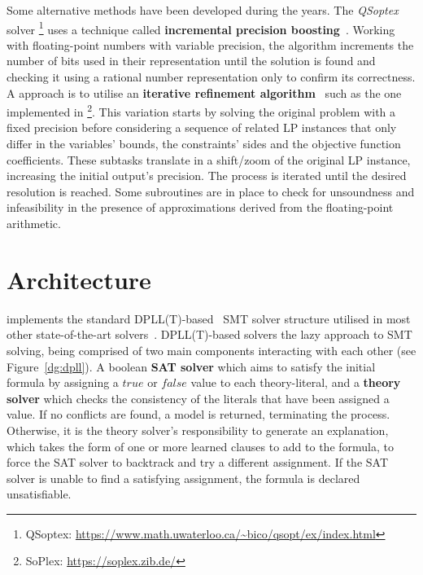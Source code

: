 \documentclass[runningheads]{llncs}
\begin{document}
Some alternative methods have been developed during the years.
The \textit{QSoptex} solver \footnote{QSoptex: \url{https://www.math.uwaterloo.ca/~bico/qsopt/ex/index.html}} uses a technique called \textbf{incremental precision boosting}~\cite{ref:precision-boosting}.
Working with floating-point numbers with variable precision, the algorithm increments the number of bits used in their representation until the solution is found and checking it using a rational number representation only to confirm its correctness.
A approach is to utilise an \textbf{iterative refinement algorithm}~\cite{ref:iterative-refinement} such as the one implemented in \soplex \footnote{SoPlex: \url{https://soplex.zib.de/}}.
This variation starts by solving the original problem with a fixed precision before considering a sequence of related LP instances that only differ in the variables' bounds, the constraints' sides and the objective function coefficients.
These subtasks translate in a shift/zoom of the original LP instance, increasing the initial output's precision.
The process is iterated until the desired resolution is reached.
Some subroutines are in place to check for unsoundness and infeasibility in the presence of approximations derived from the floating-point arithmetic.

\section{Architecture}

\dlinear implements the standard DPLL(T)-based~\cite{ref:dpll-t} SMT solver structure utilised in most other state-of-the-art solvers~\cite{ref:z3-dpll-t}.
DPLL(T)-based solvers the lazy approach to SMT solving, being comprised of two main components interacting with each other (see Figure~\ref{dg:dpll}).
A boolean \textbf{SAT solver} which aims to satisfy the initial formula by assigning a $true$ or $false$ value to each theory-literal, and a \textbf{theory solver} which checks the consistency of the literals that have been assigned a value.
If no conflicts are found, a model is returned, terminating the process.
Otherwise, it is the theory solver's responsibility to generate an explanation, which takes the form of one or more learned clauses to add to the formula, to force the SAT solver to backtrack and try a different assignment.
If the SAT solver is unable to find a satisfying assignment, the formula is declared unsatisfiable.
\end{document}
